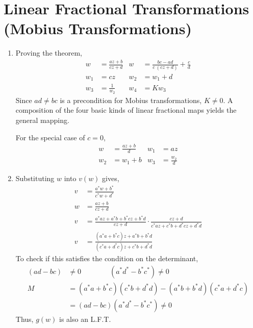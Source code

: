 \section{Linear Fractional Transformations (Mobius Transformations)}

\begin{enumerate}
    \item Proving the theorem,
          \begin{align}
              w   & = \frac{az + b}{cz + d}                     &
              w   & = \frac{bc - ad}{c\ (cz + d)} + \frac{c}{d}   \\
              w_1 & = cz                                        &
              w_2 & = w_1 + d                                     \\
              w_3 & = \frac{1}{w_2}                             &
              w_4 & = K w_3
          \end{align}
          Since $ ad \neq bc $ is a precondition for Mobius transformations,
          $ K \neq 0 $. A composition of the four basic kinds of linear fractional
          maps yields the general mapping. \par
          For the special case of $ c = 0 $,
          \begin{align}
              w   & = \frac{az + b}{d} &
              w_1 & = az                 \\
              w_2 & = w_1 + b          &
              w_3 & = \frac{w_2}{d}
          \end{align}

    \item Substituting $ w $ into $ v(w) $ gives,
          \begin{align}
              v & = \frac{a^* w + b^*}{c^* w + d^*}                                   \\
              w & = \frac{az + b}{cz + d}                                             \\
              v & = \frac{a^*a z + a^* b + b^*c z + b^* d}{cz + d} \cdot
              \frac{cz + d}{c^*az + c^*b + d^*cz + d^*d}                              \\
              v & = \frac{(a^*a + b^*c)z + a^*b + b^*d}{(c^*a + d^*c)z + c^*b + d^*d}
          \end{align}
          To check if this satisfies the condition on the determinant,
          \begin{align}
              (ad - bc) & \neq 0 \qquad\qquad (a^*d^* - b^*c^*) \neq 0              \\
              M         & = (a^*a + b^*c)(c^*b + d^*d) - (a^*b + b^*d)(c^*a + d^*c) \\
                        & = (ad - bc)(a^*d^* - b^*c^*) \neq 0
          \end{align}
          Thus, $ g(w) $ is also an L.F.T.


\end{enumerate}
